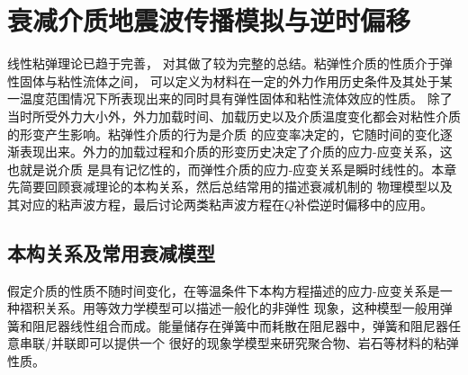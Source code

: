 
\chapter{衰减介质地震波传播模拟与逆时偏移}

线性粘弹理论已趋于完善， 对其做了较为完整的总结。粘弹性介质的性质介于弹性固体与粘性流体之间，
可以定义为材料在一定的外力作用历史条件及其处于某一温度范围情况下所表现出来的同时具有弹性固体和粘性流体效应的性质。
除了当时所受外力大小外，外力加载时间、加载历史以及介质温度变化都会对粘性介质的形变产生影响。粘弹性介质的行为是介质
的应变率决定的，它随时间的变化逐渐表现出来。外力的加载过程和介质的形变历史决定了介质的应力-应变关系，这也就是说介质
是具有记忆性的，而弹性介质的应力-应变关系是瞬时线性的。本章先简要回顾衰减理论的本构关系，然后总结常用的描述衰减机制的
物理模型以及其对应的粘声波方程，最后讨论两类粘声波方程在$Q$补偿逆时偏移中的应用。

\vspace{1.0cm}

\section{本构关系及常用衰减模型}

假定介质的性质不随时间变化，在等温条件下本构方程描述的应力-应变关系是一种褶积关系。用等效力学模型可以描述一般化的非弹性
现象，这种模型一般用弹簧和阻尼器线性组合而成。能量储存在弹簧中而耗散在阻尼器中，弹簧和阻尼器任意串联/并联即可以提供一个
很好的现象学模型来研究聚合物、岩石等材料的粘弹性质。

